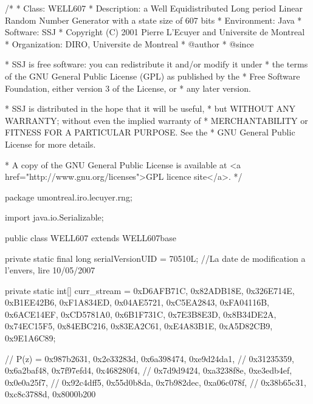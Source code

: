 \begin{code}
\begin{hide}
/*
 * Class:        WELL607
 * Description:  a Well Equidistributed Long period Linear Random Number
                 Generator with a state size of 607 bits
 * Environment:  Java
 * Software:     SSJ
 * Copyright (C) 2001  Pierre L'Ecuyer and Universite de Montreal
 * Organization: DIRO, Universite de Montreal
 * @author
 * @since

 * SSJ is free software: you can redistribute it and/or modify it under
 * the terms of the GNU General Public License (GPL) as published by the
 * Free Software Foundation, either version 3 of the License, or
 * any later version.

 * SSJ is distributed in the hope that it will be useful,
 * but WITHOUT ANY WARRANTY; without even the implied warranty of
 * MERCHANTABILITY or FITNESS FOR A PARTICULAR PURPOSE.  See the
 * GNU General Public License for more details.

 * A copy of the GNU General Public License is available at
   <a href="http://www.gnu.org/licenses">GPL licence site</a>.
 */
\end{hide}
package umontreal.iro.lecuyer.rng; \begin{hide}

import java.io.Serializable;\end{hide}

public class WELL607 extends WELL607base \begin{hide} {

   private static final long serialVersionUID = 70510L;
   //La date de modification a l'envers, lire 10/05/2007

   private static int[] curr_stream = {0xD6AFB71C, 0x82ADB18E, 0x326E714E,
                                       0xB1EE42B6, 0xF1A834ED, 0x04AE5721,
                                       0xC5EA2843, 0xFA04116B, 0x6ACE14EF,
                                       0xCD5781A0, 0x6B1F731C, 0x7E3B8E3D,
                                       0x8B34DE2A, 0x74EC15F5, 0x84EBC216,
                                       0x83EA2C61, 0xE4A83B1E, 0xA5D82CB9,
                                       0x9E1A6C89};

   // P(z) = {0x987b2631, 0x2e33283d, 0x6a398474, 0xe9d24da1,
   //         0x31235359, 0x6a2baf48, 0x7f97efd4, 0x468280f4,
   //         0x7d9d9424, 0xa3238f8e, 0xe3edb4ef, 0x0e0a25f7,
   //         0x92c4dff5, 0x55d0b8da, 0x7b982dec, 0xa06c078f,
   //         0x38b65c31, 0xc8c3788d, 0x8000b200}

}
\end{hide}
\end{code}
